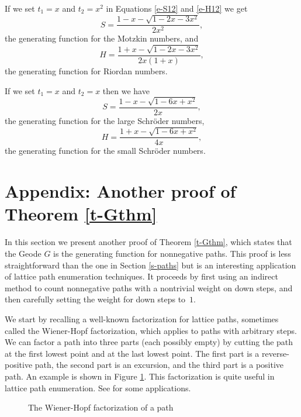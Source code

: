 \documentclass[12pt,reqno, oneside]{amsart}
\begin{document}
If we set $t_1=x$ and $t_2=x^2$ in Equations \eqref{e-S12} and \eqref{e-H12} we get
\begin{equation*}
 S= \frac{1-x -\sqrt{1-2x-3x^2}}{2x^2},
\end{equation*}
the generating function for the Motzkin numbers, and
\begin{equation*}
H = \frac{1+x-\sqrt{1-2x-3x^2}}{2x(1+x)},
\end{equation*}
the generating function for Riordan numbers. 

If we set $t_1=x$ and $t_2=x$ then we have
\begin{equation*}
S = \frac{1-x-\sqrt{1-6x+x^2}}{2x},
\end{equation*}
the generating function for the large Schr\"oder numbers,
\[H= \frac{1+x-\sqrt{1-6x+x^2}}{4x},\]
the generating function for the small Schr\"oder numbers.


\section{Appendix: Another proof of Theorem \ref{t-Gthm}}
\label{s-app}

In this section we present another proof of Theorem \ref{t-Gthm}, which states that the Geode $G$ is the generating function for nonnegative paths. This proof is less straightforward than the one in Section \ref{s-paths} but is an interesting application of lattice path enumeration techniques. It proceeds by first using an indirect method to count nonnegative paths with a nontrivial weight on down steps, and then carefully setting the weight for down steps  to~$1$.

We start by recalling a well-known factorization for lattice paths, sometimes called the Wiener-Hopf factorization, which applies to paths with arbitrary steps.  We can factor a path into three parts (each possibly empty) by cutting the path at the first lowest point and at the last lowest point. 
The first part is a reverse-positive path, the second part is an excursion, and the third part is a positive path.
An example is shown in Figure \ref{f-wh}. This factorization is quite useful in lattice path enumeration. See \cite{analytic,bf,pathology,imgfact,cristobal} for some applications.
\begin{figure}[h]
\caption{The Wiener-Hopf factorization of a path}
\label{f-wh}
\end{figure}
\end{document}
